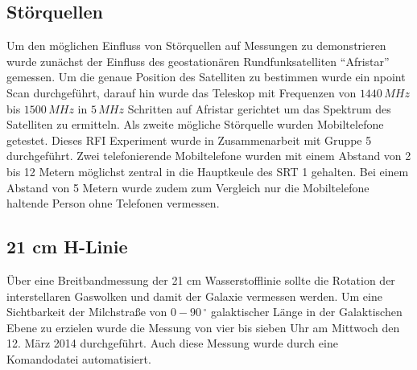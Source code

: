 \subsection{Störquellen}
Um den möglichen Einfluss von Störquellen auf Messungen zu demonstrieren wurde zunächst der Einfluss des geostationären Rundfunksatelliten \enquote{Afristar} gemessen. Um die genaue Position des Satelliten zu bestimmen wurde ein npoint Scan durchgeführt, darauf hin wurde das Teleskop mit Frequenzen von $1440\,MHz$ bis $1500\,MHz$ in $5\,MHz$ Schritten auf Afristar gerichtet um das Spektrum des Satelliten zu ermitteln.
Als zweite mögliche Störquelle wurden Mobiltelefone getestet. Dieses RFI Experiment wurde in Zusammenarbeit mit Gruppe 5 durchgeführt. Zwei telefonierende Mobiltelefone wurden mit einem Abstand von 2 bis 12 Metern möglichst zentral in die Hauptkeule des SRT 1 gehalten. Bei einem Abstand von 5 Metern wurde zudem zum Vergleich nur die Mobiltelefone haltende Person ohne Telefonen vermessen.
\subsection{21 cm H-Linie}
Über eine Breitbandmessung der 21 cm Wasserstofflinie sollte die Rotation der interstellaren Gaswolken und damit der Galaxie vermessen werden. Um eine Sichtbarkeit der Milchstraße von $0-90\,^\circ$ galaktischer Länge in der Galaktischen Ebene zu erzielen wurde die Messung von vier bis sieben Uhr am Mittwoch den 12. März 2014 durchgeführt. Auch diese Messung wurde durch eine Komandodatei automatisiert.

